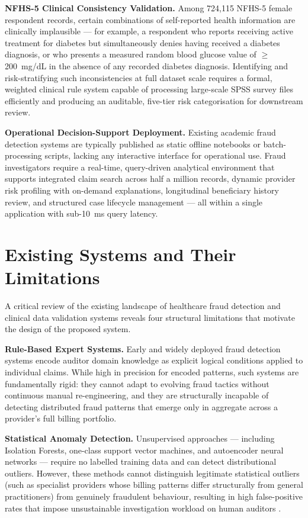 \textbf{NFHS-5 Clinical Consistency Validation.} Among 724,115 NFHS-5 female respondent records, certain combinations of self-reported health information are clinically implausible --- for example, a respondent who reports receiving active treatment for diabetes but simultaneously denies having received a diabetes diagnosis, or who presents a measured random blood glucose value of $\geq$200~mg/dL in the absence of any recorded diabetes diagnosis. Identifying and risk-stratifying such inconsistencies at full dataset scale requires a formal, weighted clinical rule system capable of processing large-scale SPSS survey files efficiently and producing an auditable, five-tier risk categorisation for downstream review.

\textbf{Operational Decision-Support Deployment.} Existing academic fraud detection systems are typically published as static offline notebooks or batch-processing scripts, lacking any interactive interface for operational use. Fraud investigators require a real-time, query-driven analytical environment that supports integrated claim search across half a million records, dynamic provider risk profiling with on-demand explanations, longitudinal beneficiary history review, and structured case lifecycle management --- all within a single application with sub-10~ms query latency.

\section{Existing Systems and Their Limitations}
\label{sec:existing}

A critical review of the existing landscape of healthcare fraud detection and clinical data validation systems reveals four structural limitations that motivate the design of the proposed system.

\textbf{Rule-Based Expert Systems.} Early and widely deployed fraud detection systems encode auditor domain knowledge as explicit logical conditions applied to individual claims. While high in precision for encoded patterns, such systems are fundamentally rigid: they cannot adapt to evolving fraud tactics without continuous manual re-engineering, and they are structurally incapable of detecting distributed fraud patterns that emerge only in aggregate across a provider's full billing portfolio.

\textbf{Statistical Anomaly Detection.} Unsupervised approaches --- including Isolation Forests, one-class support vector machines, and autoencoder neural networks --- require no labelled training data and can detect distributional outliers. However, these methods cannot distinguish legitimate statistical outliers (such as specialist providers whose billing patterns differ structurally from general practitioners) from genuinely fraudulent behaviour, resulting in high false-positive rates that impose unsustainable investigation workload on human auditors \cite{b2}.


